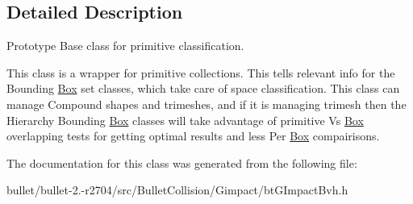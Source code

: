 \subsection{Detailed Description}
Prototype Base class for primitive classification. 

This class is a wrapper for primitive collections. This tells relevant info for the Bounding \hyperlink{class_box}{Box} set classes, which take care of space classification. This class can manage Compound shapes and trimeshes, and if it is managing trimesh then the Hierarchy Bounding \hyperlink{class_box}{Box} classes will take advantage of primitive Vs \hyperlink{class_box}{Box} overlapping tests for getting optimal results and less Per \hyperlink{class_box}{Box} compairisons. 

The documentation for this class was generated from the following file\+:\begin{DoxyCompactItemize}
\item 
bullet/bullet-\/2.-\/r2704/src/\+Bullet\+Collision/\+Gimpact/bt\+G\+Impact\+Bvh.\+h\end{DoxyCompactItemize}
